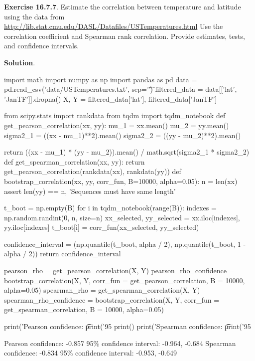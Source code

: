 \textbf{Exercise 16.7.7}. Estimate the correlation between temperature
and latitude using the data from
\url{http://lib.stat.cmu.edu/DASL/Datafiles/USTemperatures.html}
Use the correlation coefficient and Spearman rank correlation. Provide
estimates, tests, and confidence intervals.

\textbf{Solution}.

\begin{python}
import math
import numpy as np
import pandas as pd
data = pd.read_csv('data/USTemperatures.txt', sep='\t')
filtered_data = data[['lat', 'JanTF']].dropna()
X, Y = filtered_data['lat'], filtered_data['JanTF']
\end{python}

\begin{python}
from scipy.stats import rankdata
from tqdm import tqdm_notebook
def get_pearson_correlation(xx, yy):
    mu_1 = xx.mean()
    mu_2 = yy.mean()
    sigma2_1 = ((xx - mu_1)**2).mean()
    sigma2_2 = ((yy - mu_2)**2).mean()
    
    return ((xx - mu_1) * (yy - mu_2)).mean() / math.sqrt(sigma2_1 * sigma2_2)
def get_spearman_correlation(xx, yy):
    return get_pearson_correlation(rankdata(xx), rankdata(yy))
def bootstrap_correlation(xx, yy, corr_fun, B=10000, alpha=0.05):
    n = len(xx)
    assert len(yy) == n, 'Sequences must have same length'
    
    t_boot = np.empty(B)
    for i in tqdm_notebook(range(B)):
        indexes = np.random.randint(0, n, size=n)
        xx_selected, yy_selected = xx.iloc[indexes], yy.iloc[indexes]
        t_boot[i] = corr_fun(xx_selected, yy_selected)
        
    confidence_interval = (np.quantile(t_boot, alpha / 2), np.quantile(t_boot, 1 - alpha / 2))
    return confidence_interval
\end{python}

\begin{python}
pearson_rho = get_pearson_correlation(X, Y)
pearson_rho_confidence = bootstrap_correlation(X, Y, 
    corr_fun = get_pearson_correlation, B = 10000, alpha=0.05)
spearman_rho = get_spearman_correlation(X, Y)
spearman_rho_confidence = bootstrap_correlation(X, Y, 
    corr_fun = get_spearman_correlation, B = 10000, alpha=0.05)
\end{python}

\begin{python}
print('Pearson confidence: \t %
print('95%
print()
print('Spearman confidence: \t %
print('95%
\end{python}
\begin{console}
Pearson confidence:      -0.857
95\% confidence interval: -0.964, -0.684
Spearman confidence:     -0.834
95\% confidence interval: -0.953, -0.649
\end{console}

